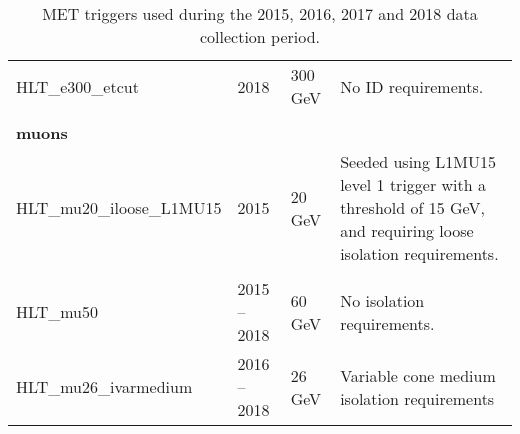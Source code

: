 \begin{table}[h]
\begin{center}
{\begin{tabular}{ l l l p{7cm} }
        HLT\_e300\_etcut & 2018 & 300 GeV & No ID requirements. \\
                                &&&\\
        \multicolumn{4}{l}{\bfseries{muons}}\\
        HLT\_mu20\_iloose\_L1MU15 & 2015 & 20 GeV & Seeded using L1MU15 level 1 trigger with a threshold of 15 GeV, and requiring loose isolation requirements.\\
                                &&&\\
        HLT\_mu50\ & 2015 -- 2018 & 60 GeV  & No isolation requirements. \\
        HLT\_mu26\_ivarmedium & 2016 -- 2018 & 26 GeV & Variable cone medium isolation requirements \\
        \bottomrule
      \end{tabular}
    }
    \caption{ MET triggers used during the 2015, 2016, 2017 and 2018 data collection period. }
    \label{tab:mettrigs}
  \end{center}
\end{table}